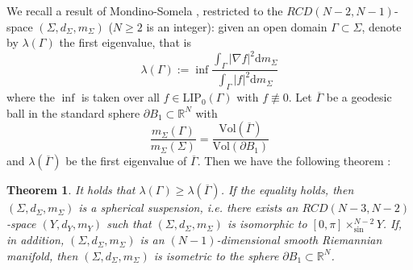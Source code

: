 \documentclass{article}
\newtheorem{theorem}{Theorem}[section]
\theoremstyle{remark}
\numberwithin{equation}{section}
\theoremstyle{definition}
\begin{document}
     We recall a result of Mondino-Somela \cite{Mondino-Semola_2020}, restricted to the $RCD(N-2,N-1)$-space $(\Sigma,d_{\Sigma},m_{\Sigma})$ ($N \ge 2$ is an integer): given an open domain $\Gamma \subset \Sigma$, denote by $\lambda(\Gamma)$ the first eigenvalue, that is
     \begin{equation}
     	\lambda(\Gamma) := \inf \frac{\int_{\Gamma} \vert \nabla f \rvert^{2} \mathrm{d}m_{\Sigma}}{\int_{\Gamma} \lvert f \rvert^{2} \mathrm{d}m_{\Sigma}}
     \end{equation}
     where the $\inf$ is taken over all $f \in \mathrm{LIP}_{0}(\Gamma)$ with $f \not\equiv 0$. Let $\overline{\Gamma}$ be a geodesic ball in the standard sphere $\partial B_{1} \subset \mathbb{R}^{N}$ with
     \begin{equation}
     	\frac{m_{\Sigma}(\Gamma)}{m_{\Sigma}(\Sigma)} = \frac{\mathrm{Vol}(\overline{\Gamma})}{\mathrm{Vol}(\partial B_{1})}
     \end{equation}
  and $\lambda(\overline{\Gamma})$ be the first eigenvalue of $\overline{\Gamma}$. Then we have the following theorem \cite[Theorem 1.5, Theorem 1.6, Corollary 1.7]{Mondino-Semola_2020}:
     \begin{theorem}\label{Faber_Krahn}
     	It holds that $\lambda(\Gamma) \ge \lambda(\overline{\Gamma})$. If the equality holds, then $(\Sigma,d_{\Sigma},m_{\Sigma
     	})$ is a spherical suspension, i.e. there exists an $RCD(N-3,N-2)$-space $(Y,d_{Y},m_{Y})$ such that $(\Sigma,d_{\Sigma},m_{\Sigma})$ is isomorphic to $[0,\pi]\times_{\sin}^{N-2}Y$. If, in addition, $(\Sigma,d_{\Sigma},m_{\Sigma})$ is an $(N-1)$-dimensional smooth Riemannian manifold, then $(\Sigma,d_{\Sigma},m_{\Sigma})$ is isometric to the sphere $\partial B_{1} \subset \mathbb{R}^{N}$.
     \end{theorem}
\end{document}
